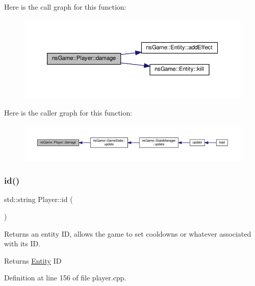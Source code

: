 Here is the call graph for this function\+:\nopagebreak
\begin{figure}[H]
\begin{center}
\leavevmode
\includegraphics[width=350pt]{classns_game_1_1_player_a6593cce5f194289c251eba839972aaac_cgraph}
\end{center}
\end{figure}
Here is the caller graph for this function\+:\nopagebreak
\begin{figure}[H]
\begin{center}
\leavevmode
\includegraphics[width=350pt]{classns_game_1_1_player_a6593cce5f194289c251eba839972aaac_icgraph}
\end{center}
\end{figure}
\mbox{\label{classns_game_1_1_player_a339da658eb7a76de90ac66ec5cde929b}} 
\subsubsection{\texorpdfstring{id()}{id()}}
{\footnotesize\ttfamily std\+::string Player\+::id (\begin{DoxyParamCaption}{ }\end{DoxyParamCaption})}



Returns an entity ID, allows the game to set cooldowns or whatever associated with its ID. 

\begin{DoxyReturn}{Returns}
\hyperlink{structns_game_1_1_entity}{Entity} ID 
\end{DoxyReturn}


Definition at line 156 of file player.\+cpp.

